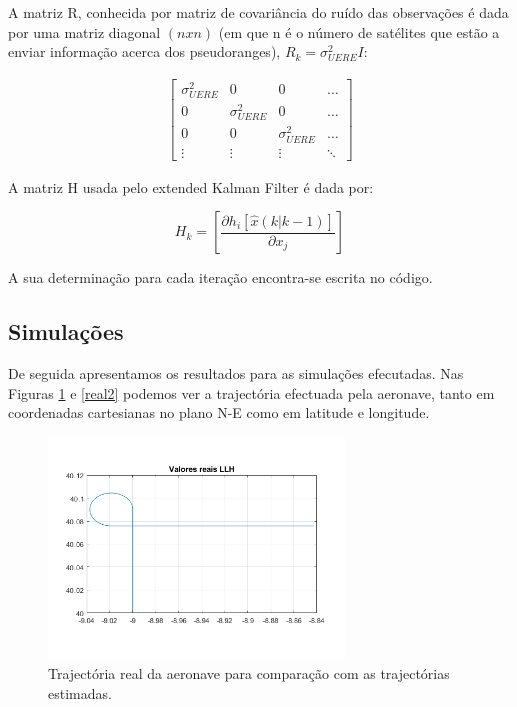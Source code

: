 \documentclass[palatino]{ist-report}
\begin{document}
A matriz R, conhecida por matriz de covariância do ruído das observações é dada por uma matriz diagonal $(n x n)$ (em que n é o número de satélites que estão a enviar informação acerca dos pseudoranges), $R_k=\sigma_{UERE}^2 I$:


\begin{align*}
\begin{bmatrix}
\sigma_{UERE}^2 & 0 & 0 & \hdots \\
0 & \sigma_{UERE}^2 & 0 & \hdots \\
0 & 0 & \sigma_{UERE}^2 & \hdots \\
\vdots & \vdots & \vdots & \ddots
\end{bmatrix} 
\end{align*}

A matriz H usada pelo extended Kalman Filter é dada por:


\begin{equation*}
    H_k = \left[\frac{\partial h_i [\hat{x}(k|k-1)]}{\partial x_j}\right]
\end{equation*}

A sua determinação para cada iteração encontra-se escrita no código. 


\subsection{Simulações}

De seguida apresentamos os resultados para as simulações efecutadas. Nas Figuras \ref{real1} e \ref{real2} podemos ver a trajectória efectuada pela aeronave, tanto em coordenadas cartesianas no plano N-E como em latitude e longitude.

\begin{figure}[ht]
	\centering
	\includegraphics[width=0.7\textwidth,trim={0 15mm 0 12mm},clip]{graphics/plot_posicao_real_LLH11.png}
	\caption{Trajectória real da aeronave para comparação com as trajectórias estimadas.}
	\label{real1}
\end{figure}
\end{document}
